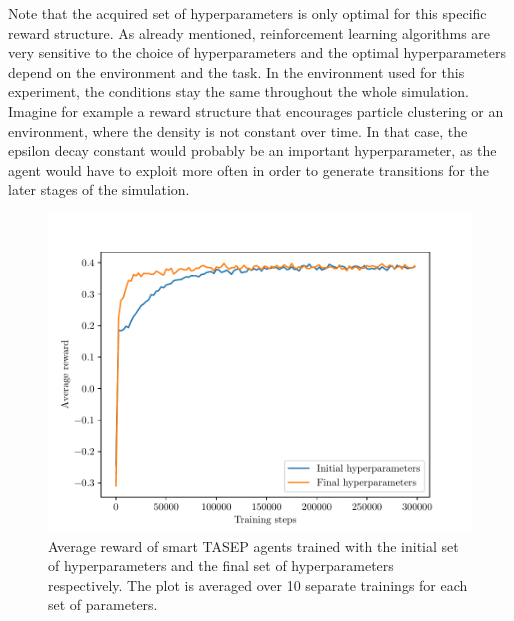 Note that the acquired set of hyperparameters is only optimal for this specific reward structure. As already mentioned, reinforcement learning algorithms are very sensitive to the choice of hyperparameters and the optimal hyperparameters depend on the environment and the task. In the environment used for this experiment, the conditions stay the same throughout the whole simulation. Imagine for example a reward structure that encourages particle clustering or an environment, where the density is not constant over time. In that case, the epsilon decay constant would probably be an important hyperparameter, as the agent would have to exploit more often in order to generate transitions for the later stages of the simulation. 
\begin{figure}[h]
    \centering
    \includegraphics[width=\textwidth]{hyperparam_optim_initial_vs_final.pdf}
    \caption{Average reward of smart TASEP agents trained with the initial set of hyperparameters and the final set of hyperparameters respectively. The plot is averaged over 10 separate trainings for each set of parameters.}
    \label{fig:hyperparam_optim_final_vs_initial}
\end{figure}